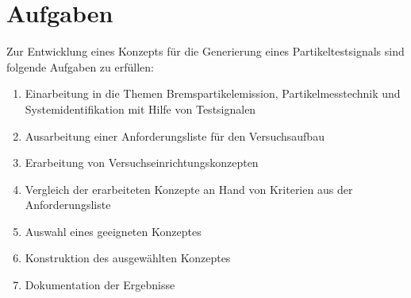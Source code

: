 \section{Aufgaben}
Zur Entwicklung eines Konzepts f\"{u}r die Generierung eines Partikeltestsignals sind folgende Aufgaben zu erf\"{u}llen:
\begin{enumerate}
	\item Einarbeitung in die Themen Bremspartikelemission, Partikelmesstechnik und Systemidentifikation mit Hilfe von Testsignalen
	\item Ausarbeitung einer Anforderungsliste f\"{u}r den Versuchsaufbau
	\item Erarbeitung von Versuchseinrichtungskonzepten
	\item Vergleich der erarbeiteten Konzepte an Hand von Kriterien aus der Anforderungsliste
	\item Auswahl eines geeigneten Konzeptes
	\item Konstruktion des ausgew\"{a}hlten Konzeptes
	\item Dokumentation der Ergebnisse 
\end{enumerate}